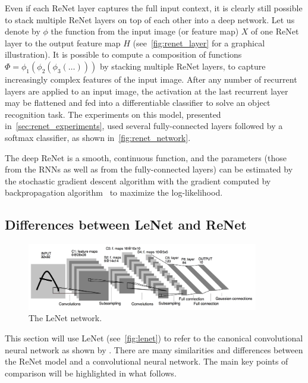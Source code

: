 Even if each ReNet layer captures the full input context, it is clearly still
possible to stack multiple ReNet layers on top of each other into a deep
network. Let us denote by $\phi$ the function from the input image (or feature
map) $X$ of one ReNet layer to the output feature map $H$
(see~\autoref{fig:renet_layer} for a graphical illustration). It is possible
to compute a composition of functions $\Phi = \phi_1(\phi_2(\phi_3(\dots)))$ by
stacking multiple ReNet layers, to capture increasingly complex features of the
input image.  After any number of recurrent layers are applied to an input
image, the activation at the last recurrent layer may be flattened and fed into
a differentiable classifier to solve an object recognition task. The
experiments on this model, presented in~\autoref{sec:renet_experiments}, used
several fully-connected layers followed by a softmax classifier, as shown
in~\autoref{fig:renet_network}.

The deep ReNet is a smooth, continuous function, and the parameters (those from
the RNNs as well as from the fully-connected layers) can be estimated by the
stochastic gradient descent algorithm with the gradient computed by
backpropagation algorithm~\citep[see, e.g.,][]{BP86} to maximize the
log-likelihood.

\subsection{Differences between LeNet and ReNet}\label{sec:lenetrenet}

\begin{figure}[t]
    \centering
    \includegraphics[width=0.9\textwidth]{img/renet/lenet5.jpg}
    \caption{The LeNet network.}
    \label{fig:lenet}
    \vspace{-3mm}
\end{figure}

This section will use LeNet (see~\autoref{fig:lenet}) to refer to the canonical
convolutional neural network as shown by \citet{LeCun89}. There are many
similarities and differences between the ReNet model and a convolutional neural
network. The main key points of comparison will be highlighted in what follows.

